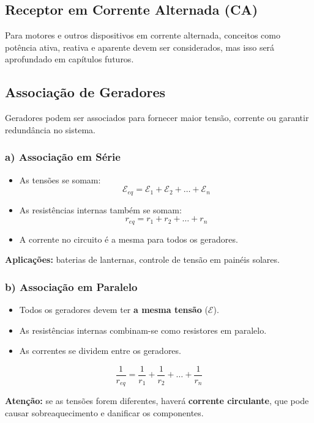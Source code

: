 \subsection{Receptor em Corrente Alternada (CA)}
Para motores e outros dispositivos em corrente alternada, conceitos como potência ativa, reativa e aparente devem ser considerados, mas isso será aprofundado em capítulos futuros.

\subsection{Associação de Geradores}
Geradores podem ser associados para fornecer maior tensão, corrente ou garantir redundância no sistema.

\subsubsection{a) Associação em Série}
\begin{itemize}
    \item As tensões se somam:
    \[
    \mathcal{E}_{eq} = \mathcal{E}_1 + \mathcal{E}_2 + \dots + \mathcal{E}_n
    \]
    \item As resistências internas também se somam:
    \[
    r_{eq} = r_1 + r_2 + \dots + r_n
    \]
    \item A corrente no circuito é a mesma para todos os geradores.
\end{itemize}

\textbf{Aplicações:} baterias de lanternas, controle de tensão em painéis solares.

\subsubsection{b) Associação em Paralelo}
\begin{itemize}
    \item Todos os geradores devem ter \textbf{a mesma tensão} ($\mathcal{E}$).
    \item As resistências internas combinam-se como resistores em paralelo.
    \item As correntes se dividem entre os geradores.
\end{itemize}

\[
\frac{1}{r_{eq}} = \frac{1}{r_1} + \frac{1}{r_2} + \dots + \frac{1}{r_n}
\]

\textbf{Atenção:} se as tensões forem diferentes, haverá \textbf{corrente circulante}, que pode causar sobreaquecimento e danificar os componentes.

